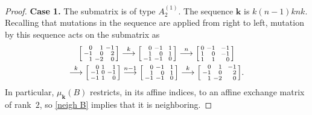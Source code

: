 \documentclass{amsart}
\theoremstyle{definition}
\theoremstyle{remark}
\numberwithin{equation}{section}
\newcommand{\0}{{\mathbf{0}}}
\newcommand{\kk}{\mathbf{k}}
\begin{document}
\begin{proof}
\noindent
\textbf{Case 1.}
The submatrix is of type $A_2^{(1)}$.
The sequence $\kk$ is $k(n-1)knk$.
Recalling that mutations in the sequence are applied from right to left, mutation by this sequence acts on the submatrix as
\begin{multline*}
\begin{bsmallmatrix*}[r]
0&1&-1\\
-1&0&2\\
1&-2&0
\end{bsmallmatrix*}
\overset{k}{\longrightarrow}
\begin{bsmallmatrix*}[r]
0&-1&\,\,\,1\\
1&0&1\\
-1&-1&0
\end{bsmallmatrix*}
\overset{n}{\longrightarrow}
\begin{bsmallmatrix*}[r]
0&-1&\,\,\,-1\\
1&0&-1\\
1&1&0
\end{bsmallmatrix*}\\
\overset{k}{\longrightarrow}
\begin{bsmallmatrix*}[r]
0&1&\,\,\,1\\
-1&0&-1\\
-1&1&0
\end{bsmallmatrix*}
\overset{n-1}{\longrightarrow}
\begin{bsmallmatrix*}[r]
0&-1&\,\,\,1\\
1&0&1\\
-1&-1&0
\end{bsmallmatrix*}
\overset{k}{\longrightarrow}
\begin{bsmallmatrix*}[r]
0&1&\,\,\,-1\\
-1&0&2\\
1&-2&0
\end{bsmallmatrix*}.
\end{multline*}
In particular, $\mu_\kk(B)$ restricts, in its affine indices, to an affine exchange matrix of rank~$2$,
so \cref{neigh B} implies that it is neighboring.


\end{proof}
\end{document}
